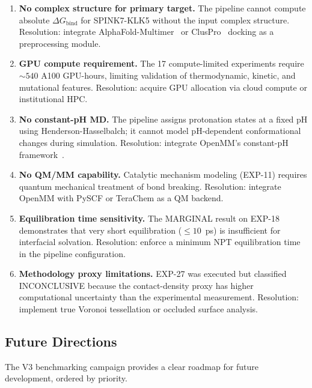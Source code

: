 \documentclass[conference]{IEEEtran}
\begin{document}
\begin{enumerate}
  \item \textbf{No complex structure for primary target.}  The pipeline
    cannot compute absolute $\Delta G_{\mathrm{bind}}$ for SPINK7-KLK5
    without the input complex structure.  Resolution: integrate
    AlphaFold-Multimer~\cite{evans2022} or ClusPro~\cite{kozakov2017}
    docking as a preprocessing module.

  \item \textbf{GPU compute requirement.}  The 17 compute-limited
    experiments require ${\sim}540$ A100 GPU-hours, limiting validation of
    thermodynamic, kinetic, and mutational features.  Resolution: acquire
    GPU allocation via cloud compute or institutional HPC.

  \item \textbf{No constant-pH MD.}  The pipeline assigns protonation
    states at a fixed pH using Henderson-Hasselbalch; it cannot model
    pH-dependent conformational changes during simulation.  Resolution:
    integrate OpenMM's constant-pH framework~\cite{chen2015}.

  \item \textbf{No QM/MM capability.}  Catalytic mechanism modeling
    (EXP-11) requires quantum mechanical treatment of bond breaking.
    Resolution: integrate OpenMM with PySCF or TeraChem as a QM backend.

  \item \textbf{Equilibration time sensitivity.}  The MARGINAL result on
    EXP-18 demonstrates that very short equilibration ($\leq 10$~ps) is
    insufficient for interfacial solvation.  Resolution: enforce a
    minimum NPT equilibration time in the pipeline configuration.

  \item \textbf{Methodology proxy limitations.}  EXP-27 was executed but
    classified INCONCLUSIVE because the contact-density proxy has higher
    computational uncertainty than the experimental measurement.
    Resolution: implement true Voronoi tessellation or occluded surface
    analysis.
\end{enumerate}

\subsection{Future Directions}\label{sec:v3_future}

The V3 benchmarking campaign provides a clear roadmap for future
development, ordered by priority.
\end{document}
